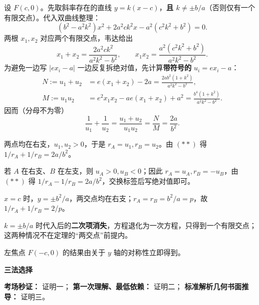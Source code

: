 \begin{proofbox}
  设 $F(c,0)$。先取斜率存在的直线 $y=k(x-c)$，\textbf{且 $k\neq\pm b/a$}（否则仅有一个有限交点）。代入双曲线整理：
  \[
    (b^2-a^2k^2)x^2+2a^2ck^2x-a^2(c^2k^2+b^2)=0.
  \]
  两根 $x_1,x_2$ 对应两个有限交点，韦达给出
  \[
    x_1+x_2=\frac{2a^2ck^2}{a^2k^2-b^2},\qquad
    x_1x_2=\frac{a^2(c^2k^2+b^2)}{a^2k^2-b^2}.
  \]
  为避免一边写 $|ex_i-a|$ 一边反复拆绝对值，先计算\textbf{带符号的} $u_i=ex_i-a$：
  \[
    \begin{aligned}
      N:=u_1+u_2&=e(x_1+x_2)-2a
      =\frac{2ab^2(1+k^2)}{a^2k^2-b^2},\\
      M:=u_1u_2&=e^2x_1x_2-ae(x_1+x_2)+a^2
      =\frac{b^4(1+k^2)}{a^2k^2-b^2}.
    \end{aligned}
  \]
  因而（分母不为零）
  \[
    \boxed{\frac1{u_1}+\frac1{u_2}=\frac{u_1+u_2}{u_1u_2}
    =\frac NM=\frac{2a}{b^2}}.\tag{**}
  \]
  \begin{description}[style=nextline,leftmargin=2.8em,labelsep=0.5em,itemsep=0.4em]
    \item[\textbf{同支：}] 两点均在右支，$u_1,u_2>0$，于是 $r_A=u_1,r_B=u_2$。由 $(**)$ 得 $1/r_A+1/r_B=2a/b^2$。
    \item[\textbf{异支：}] 若 $A$ 在右支、$B$ 在左支，则 $u_A>0,u_B<0$；因此 $r_A=u_A,r_B=-u_B$，由 $(**)$ 得 $1/r_A-1/r_B=2a/b^2$，交换标签后写绝对值即可。
    \item[\textbf{斜率不存在：}] $x=c$ 时，$y=\pm b^2/a$，两交点均在右支；$r_A=r_B=b^2/a=p$，故 $1/r_A+1/r_B=2/p$。
    \item[\textbf{渐近线方向：}] $k=\pm b/a$ 时代入后的\textbf{二次项消失}，方程退化为一次方程，只得到一个有限交点；这两种情况不在定理的“两交点”前提内。
  \end{description}
  左焦点 $F(-c,0)$ 的结果由关于 $y$ 轴的对称性立即得到。

  \medskip
  \textbf{\textcolor{CProof}{三法选择}}

  \textbf{考场秒证：} 证明一；\quad
  \textbf{第一次理解、最低依赖：} 证明二；\quad
  \textbf{标准解析几何书面推导：} 证明三。
\end{proofbox}
